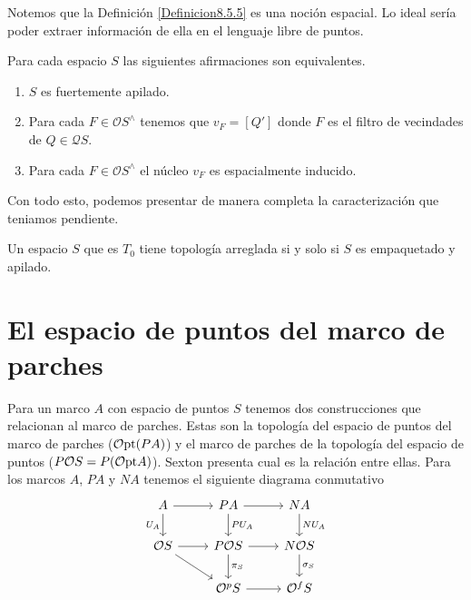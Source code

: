 Notemos que la Definición \ref{Definicion8.5.5} es una noción espacial. Lo ideal sería poder extraer información de ella en el lenguaje libre de puntos.
\begin{lem}\label{Lema8.5.11} 
    Para cada espacio $S$ las siguientes afirmaciones son equivalentes.
    \begin{enumerate}
        \item $S$ es fuertemente apilado.
        \item Para cada $F\in \mathcal{O}S^\wedge$ tenemos que $v_F=[Q']$ donde $F$ es el filtro de vecindades de $Q\in \mathcal{Q}S$.
        \item Para cada $F\in \mathcal{O}S^\wedge$ el núcleo $v_F$ es espacialmente inducido.
    \end{enumerate}
\end{lem}

Con todo esto, podemos presentar de manera completa la caracterización que teniamos pendiente.
\begin{thm}\label{Teorema8.5.12}
    Un espacio $S$ que es $T_0$ tiene topología arreglada si y solo si $S$ es empaquetado y apilado.
\end{thm}

\section{El espacio de puntos del marco de parches}

Para un marco $A$ con espacio de puntos $S$ tenemos dos construcciones que relacionan al marco de parches. Estas son la topología del espacio de puntos del marco de parches ($\mathcal{O}\mathrm{pt}(PA)$) y el marco de parches de la topología del espacio de puntos ($P\mathcal{O}S=P(\mathcal{O}\mathrm{pt} A)$). Sexton presenta cual es la relación entre ellas. 
Para los marcos $A$, $PA$ y $NA$ tenemos el siguiente diagrama conmutativo
\[\begin{tikzcd}
	A & PA & NA \\
	{\mathcal{O}S} & {P\mathcal{O}S} & {N\mathcal{O}S} \\
	& {\mathcal{O}^pS} & {\mathcal{O}^fS}
	\arrow[from=1-1, to=1-2]
	\arrow["{U_A}"', from=1-1, to=2-1]
	\arrow[from=1-2, to=1-3]
	\arrow["{PU_A}", from=1-2, to=2-2]
	\arrow["{NU_A}", from=1-3, to=2-3]
	\arrow[from=2-1, to=2-2]
	\arrow[from=2-1, to=3-2]
	\arrow[from=2-2, to=2-3]
	\arrow["{\pi_S}", from=2-2, to=3-2]
	\arrow["{\sigma_S}", from=2-3, to=3-3]
	\arrow[from=3-2, to=3-3]
\end{tikzcd}\]

